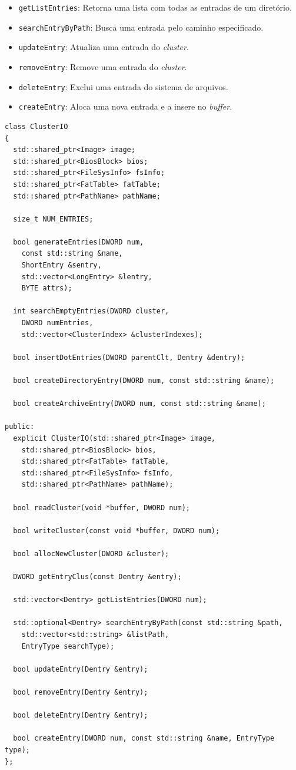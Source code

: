 \documentclass[
    12pt,				%
    oneside,   	        %
    a4paper,			%
    english,			%
    french,				%
    spanish,			%
    brazil,				%
    ]{pacotes/abntex2}
\begin{document}
\begin{itemize}
\begin{itemize}
            \item \texttt{getListEntries}: Retorna uma lista com todas as entradas de um diretório.
            \item \texttt{searchEntryByPath}: Busca uma entrada pelo caminho especificado.
            \item \texttt{updateEntry}: Atualiza uma entrada do \textit{cluster}.
            \item \texttt{removeEntry}: Remove uma entrada do \textit{cluster}.
            \item \texttt{deleteEntry}: Exclui uma entrada do sistema de arquivos.
            \item \texttt{createEntry}: Aloca uma nova entrada e a insere no \textit{buffer}.
        \end{itemize}
\end{itemize}


\begin{lstlisting}[caption={Classe de abstração dos clusters do sistema}, label={lst:cluster_io}]
class ClusterIO
{
  std::shared_ptr<Image> image;
  std::shared_ptr<BiosBlock> bios;
  std::shared_ptr<FileSysInfo> fsInfo;
  std::shared_ptr<FatTable> fatTable;
  std::shared_ptr<PathName> pathName;
  
  size_t NUM_ENTRIES;

  bool generateEntries(DWORD num,
    const std::string &name,
    ShortEntry &sentry,
    std::vector<LongEntry> &lentry,
    BYTE attrs);

  int searchEmptyEntries(DWORD cluster,
    DWORD numEntries,
    std::vector<ClusterIndex> &clusterIndexes);

  bool insertDotEntries(DWORD parentClt, Dentry &dentry);

  bool createDirectoryEntry(DWORD num, const std::string &name);

  bool createArchiveEntry(DWORD num, const std::string &name);

public:
  explicit ClusterIO(std::shared_ptr<Image> image,
    std::shared_ptr<BiosBlock> bios,
    std::shared_ptr<FatTable> fatTable,
    std::shared_ptr<FileSysInfo> fsInfo,
    std::shared_ptr<PathName> pathName);
    
  bool readCluster(void *buffer, DWORD num);

  bool writeCluster(const void *buffer, DWORD num);

  bool allocNewCluster(DWORD &cluster);

  DWORD getEntryClus(const Dentry &entry);

  std::vector<Dentry> getListEntries(DWORD num);

  std::optional<Dentry> searchEntryByPath(const std::string &path,
    std::vector<std::string> &listPath,
    EntryType searchType);

  bool updateEntry(Dentry &entry);

  bool removeEntry(Dentry &entry);

  bool deleteEntry(Dentry &entry);

  bool createEntry(DWORD num, const std::string &name, EntryType type);
};
\end{lstlisting}
\end{document}
